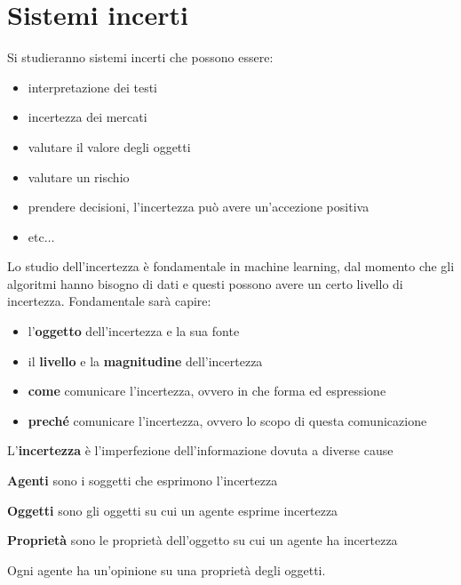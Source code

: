 \chapter{Sistemi incerti}
Si studieranno sistemi incerti che possono essere:
\begin{itemize}
    \item interpretazione dei testi
    \item incertezza dei mercati
    \item valutare il valore degli oggetti
    \item valutare un rischio
    \item prendere decisioni, l'incertezza può avere un'accezione positiva
    \item etc$\dots$
\end{itemize}

Lo studio dell'incertezza è fondamentale in machine learning, dal momento che 
gli algoritmi hanno bisogno di dati e questi possono avere un certo livello di 
incertezza. Fondamentale sarà capire:
\begin{itemize}
    \item l'\textbf{oggetto} dell'incertezza e la sua fonte
    \item il \textbf{livello} e la \textbf{magnitudine} dell'incertezza
    \item \textbf{come} comunicare l'incertezza, ovvero in che forma ed espressione
    \item \textbf{preché} comunicare l'incertezza, ovvero lo scopo di questa comunicazione
\end{itemize}

\begin{definizione}
    L'\textbf{incertezza}  è l'imperfezione dell'informazione dovuta a diverse cause
\end{definizione}
\begin{definizione}
    \textbf{Agenti} sono i soggetti che esprimono l'incertezza
\end{definizione}
\begin{definizione}
    \textbf{Oggetti} sono gli oggetti su cui un agente esprime incertezza
\end{definizione}
\begin{definizione}
    \textbf{Proprietà} sono le proprietà dell'oggetto su cui un agente ha incertezza
\end{definizione}
Ogni agente ha un'opinione su una proprietà degli oggetti.

